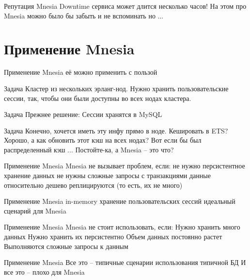 \documentclass{beamer}
\begin{document}
\begin{frame}
 Репутация Mnesia
Downtime сервиса может длится несколько часов!
На этом про Mnesia можно было бы забыть и не вспоминать
но ...
\end{frame}

\section{Применение Mnesia}

\begin{frame}
 Применение Mnesia
её можно применить с пользой
\end{frame}

\begin{frame}
 Задача
Кластер из нескольких эрланг-нод.
Нужно хранить пользовательские сессии,
так, чтобы они были доступны во всех нодах кластера.
\end{frame}

\begin{frame}
 Задача
Прежнее решение:
Сессии хранятся в MySQL
\end{frame}

\begin{frame}
 Задача
Конечно, хочется иметь эту инфу прямо в ноде.
Кешировать в ETS?
Хорошо, а как обновить этот кэш на всех нодах?
Вот если бы был распределенный кэш ...
Постойте-ка, а Mnesia -- это что?
\end{frame}

\begin{frame}
 Применение Mnesia
Mnesia не вызывает проблем, если:
не нужно персистентное хранение данных
не нужны сложные запросы с транзакциями
данные относительно дешево реплицируются (то есть, их не много)
\end{frame}

\begin{frame}
 Применение Mnesia
in-memory хранение пользовательских сессий
идеальный сценарий для Mnesia
\end{frame}

\begin{frame}
 Применение Mnesia
Mnesia не стоит использовать, если:
Нужно хранить много данных
Нужно хранить их персистентно
Объем данных постоянно растет
Выполняются сложные запросы к данным
\end{frame}

\begin{frame}
 Применение Mnesia
Все это -- типичные сценарии использования типичной БД
И все это -- плохо для Mnesia
\end{frame}
\end{document}
